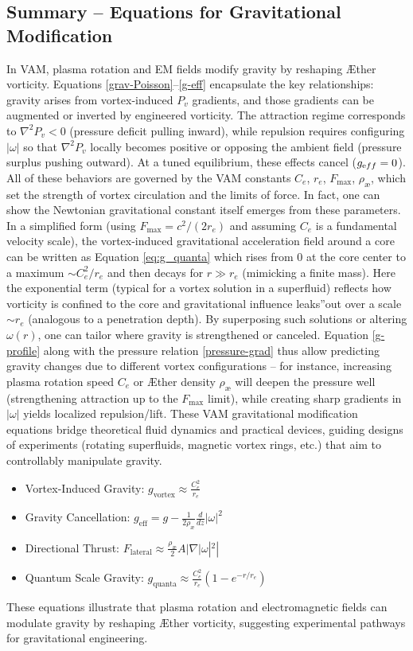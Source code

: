 \subsection*{Summary – Equations for Gravitational Modification}
In VAM, plasma rotation and EM fields modify gravity by reshaping Æther vorticity. Equations \eqref{grav-Poisson}–\eqref{g-eff} encapsulate the key relationships: gravity arises from vortex-induced $P_v$ gradients, and those gradients can be augmented or inverted by engineered vorticity. The attraction regime corresponds to $\nabla^2 P_v < 0$ (pressure deficit pulling inward), while repulsion requires configuring $|\omega|$ so that $\nabla^2 P_v$ locally becomes positive or opposing the ambient field (pressure surplus pushing outward). At a tuned equilibrium, these effects cancel ($g_{\textrm eff}=0$). All of these behaviors are governed by the VAM constants $C_e$, $r_e$, $F_{\max}$, $\rho_\text{\ae}$, which set the strength of vortex circulation and the limits of force. In fact, one can show the Newtonian gravitational constant itself emerges from these parameters. In a simplified form (using $F_{\max}=c^2/(2r_e)$ and assuming $C_e$ is a fundamental velocity scale), the vortex-induced gravitational acceleration field around a core can be written as Equation \eqref{eq:g_quanta} which rises from 0 at the core center to a maximum $\sim C_e^2/r_e$ and then decays for $r \gg r_e$ (mimicking a finite mass). Here the exponential term (typical for a vortex solution in a superfluid) reflects how vorticity is confined to the core and gravitational influence \grqq leaks\textquotedblright out over a scale $\sim r_e$ (analogous to a penetration depth). By superposing such solutions or altering $\omega(r)$, one can tailor where gravity is strengthened or canceled. Equation \eqref{g-profile} along with the pressure relation \eqref{pressure-grad} thus allow predicting gravity changes due to different vortex configurations – for instance, increasing plasma rotation speed $C_e$ or Æther density $\rho_\text{\ae}$ will deepen the pressure well (strengthening attraction up to the $F_{\max}$ limit), while creating sharp gradients in $|\omega|$ yields localized repulsion/lift. These VAM gravitational modification equations bridge theoretical fluid dynamics and practical devices, guiding designs of experiments (rotating superfluids, magnetic vortex rings, etc.) that aim to controllably manipulate gravity.


\begin{itemize}
    \item Vortex-Induced Gravity: $g_\text{vortex} \approx \frac{C_e^2}{r_e}$
    \item Gravity Cancellation: $g_\text{eff} = g - \frac{1}{2 \rho_\text{\ae}} \frac{d}{dz} |\omega|^2$
    \item Directional Thrust: $F_\text{lateral} \approx \frac{\rho_\text{\ae}}{2} A |\nabla |\omega|^2|$
    \item Quantum Scale Gravity: $g_\text{quanta} \approx \frac{C_e^2}{r_e} (1 - e^{-r/r_e})$
\end{itemize}

These equations illustrate that plasma rotation and electromagnetic fields can modulate gravity by reshaping Æther vorticity, suggesting experimental pathways for gravitational engineering.